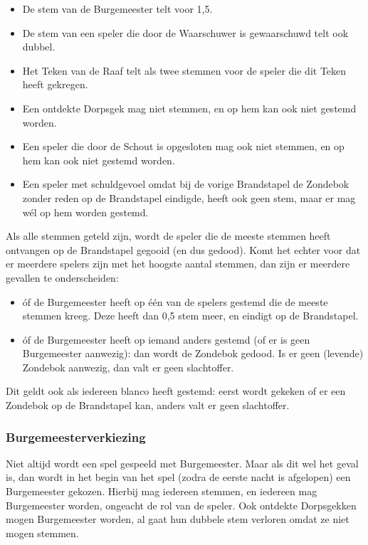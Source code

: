 \documentclass[12pt]{article}
\begin{document}
      \begin{itemize}
      	\item De stem van de Burgemeester telt voor 1,5.
      	\item De stem van een speler die door de Waarschuwer is gewaarschuwd telt ook dubbel.
      	\item Het Teken van de Raaf telt als twee stemmen voor de speler die dit Teken heeft gekregen.
      	\item Een ontdekte Dorpsgek mag niet stemmen, en op hem kan ook niet gestemd worden.
      	\item Een speler die door de Schout is opgesloten mag ook niet stemmen, en op hem kan ook niet gestemd worden.
      	\item Een speler met schuldgevoel omdat bij de vorige Brandstapel de Zondebok zonder reden op de Brandstapel eindigde, heeft ook geen stem, maar er mag w\'el op hem worden gestemd.
      \end{itemize}
      
      Als alle stemmen geteld zijn, wordt de speler die de meeste stemmen heeft ontvangen op de Brandstapel gegooid (en dus gedood). Komt het echter voor dat er meerdere spelers zijn met het hoogste aantal stemmen, dan zijn er meerdere gevallen te onderscheiden: 
      
      \begin{itemize}
       \item \'of de Burgemeester heeft op \'e\'en van de spelers gestemd die de meeste stemmen kreeg. Deze heeft dan 0,5 stem meer, en eindigt op de Brandstapel.
       \item \'of de Burgemeester heeft op iemand anders gestemd (of er is geen Burgemeester aanwezig): dan wordt de Zondebok gedood. Is er geen (levende) Zondebok aanwezig, dan valt er geen slachtoffer.
      \end{itemize}
      
      Dit geldt ook als iedereen blanco heeft gestemd: eerst wordt gekeken of er een Zondebok op de Brandstapel kan, anders valt er geen slachtoffer.

    \subsubsection{Burgemeesterverkiezing}
    
      Niet altijd wordt een spel gespeeld met Burgemeester. Maar als dit wel het geval is, dan wordt in het begin van het spel (zodra de eerste nacht is afgelopen) een Burgemeester gekozen. Hierbij mag iedereen stemmen, en iedereen mag Burgemeester worden, ongeacht de rol van de speler. Ook ontdekte Dorpsgekken mogen Burgemeester worden, al gaat hun dubbele stem verloren omdat ze niet mogen stemmen.
      
\end{document}
